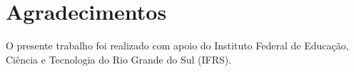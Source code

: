 \section*{Agradecimentos}
O presente trabalho foi realizado com apoio do Instituto Federal de Educação, Ciência e Tecnologia do Rio Grande do Sul (IFRS).
